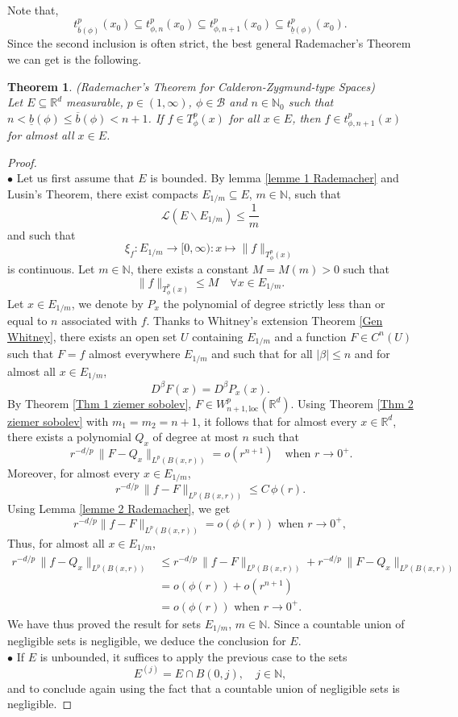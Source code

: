 \documentclass[a4paper,10pt]{article}
\theoremstyle{thmstyleone}%
\newtheorem{theorem}{Theorem}%
\theoremstyle{thmstyletwo}%
\theoremstyle{thmstylethree}%
\begin{document}
Note that, 
\[t^p_{\overline{b}(\phi)}(x_0)\subseteq t^p_{\phi,n}(x_0)\subseteq t^p_{\phi,n+1}(x_0)\subseteq t^p_{\underline{b}(\phi)}(x_0).\]
Since the second inclusion is often strict, the best general Rademacher's Theorem we can get is the following.
\begin{theorem}\label{Rademacher's Theorem for Calderon-Zygmund-type Spaces}\emph{(Rademacher's Theorem for Calderon-Zygmund-type Spaces)}
\\Let $E\subseteq \mathbb{R}^d$ measurable, $p\in(1,\infty)$, $\phi\in\mathcal{B}$ and $n\in\mathbb{N}_0$ such that $n<\underline{b}(\phi)\leq \overline{b}(\phi)<n+1$. If $f\in T^p_\phi(x)$ for all $x\in E$, then $f\in t^p_{\phi,n+1}(x)$ for almost all $x\in E$.
\end{theorem}
\begin{proof}~
\smallskip\\$\bullet$ Let us first assume that $E$ is bounded. By lemma \ref{lemme 1 Rademacher} and Lusin's Theorem, there exist compacts $E_{1/m}\subseteq E$, $m\in\mathbb{N}$, such that
\[\mathcal{L}\left(E\backslash E_{1/m}\right)\leq\frac{1}{m}\]
and such that \[\xi_f : E_{1/m} \rightarrow [0,\infty) : x\mapsto \|f\|_{T^p_\phi(x)}\] is continuous. Let $m\in\mathbb{N}$, there exists a constant $M=M(m)>0$ such that
 \[\|f\|_{T^p_\phi(x)}\leq M\quad\forall x\in E_{1/m}.\]
Let $x\in E_{1/m}$, we denote by $P_x$ the polynomial of degree strictly less than or equal to $n$ associated with $f$. Thanks to Whitney's extension Theorem \ref{Gen Whitney}, there exists an open set $U$ containing $E_{1/m}$ and a function $F\in C^n(U)$ such that $F=f$ almost everywhere $E_{1/m}$ and such that for all $|\beta|\leq n$ and for almost all $x\in E_{1/m}$,
\[D^\beta F(x)=D^\beta P_x(x).\]
By Theorem \ref{Thm 1 ziemer sobolev}, $F\in W^p_{n+1,\text{loc}}(\mathbb{R}^d)$. Using Theorem \ref{Thm 2 ziemer sobolev} with $m_1=m_2=n+1$, it follows that for almost every $x\in \mathbb{R}^d$, there exists a polynomial $Q_x$ of degree at most $n$ such that
\[\,r^{-d/p}\,\|F-Q_x\|_{L^p(B(x,r))}= o(r^{n+1})\quad \text{when } r\rightarrow 0^+.\]
Moreover, for almost every $x\in E_{1/m}$,  
\[r^{-d/p}\,\|f-F\|_{L^p(B(x,r))}\leq C\,\phi(r).\]
Using Lemma \ref{lemme 2 Rademacher}, we get
\[r^{-d/p}\|f-F\|_{L^p(B(x,r))}= o(\phi(r))\text{ when } r\rightarrow 0^+,\]
Thus, for almost all $x\in E_{1/m}$, 
\begin{align*}
r^{-d/p}\,\|f-Q_x\|_{L^p(B(x,r))}&\leq r^{-d/p}\,\|f-F\|_{L^p(B(x,r))}+r^{-d/p}\,\|F-Q_x\|_{L^p(B(x,r))}\\
&= o(\phi(r)) + o(r^{n+1})\\&= o(\phi(r))\text{ when } r\rightarrow 0^+.
\end{align*}
We have thus proved the result for sets $E_{1/m}$, $m\in\mathbb{N}$. Since a countable union of negligible sets is negligible, we deduce the conclusion for $E$.
\smallskip\\$\bullet$ If $E$ is unbounded, it suffices to apply the previous case to the sets
\[
E^{(j)} = E \cap B(0,j), \quad j \in \mathbb{N},
\]
and to conclude again using the fact that a countable union of negligible sets is negligible.
\end{proof}
\end{document}
